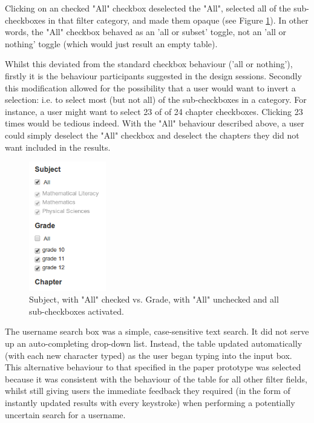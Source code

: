 Clicking on an checked "All" checkbox deselected the "All", selected all of the sub-checkboxes in that filter category, and made them opaque (see Figure \ref{fig:checkboxes2}). In other words, the "All" checkbox behaved as an 'all or subset' toggle, not an 'all or nothing' toggle (which would just result an empty table). 

Whilst this deviated from the standard checkbox behaviour ('all or nothing'), firstly it is the behaviour participants suggested in the design sessions. Secondly \citep[p. 435]{Galitz} this modification allowed for the possibility that a user would want to invert a selection: i.e. to select most (but not all) of the sub-checkboxes in a category. For instance, a user might want to select 23 of of 24 chapter checkboxes. Clicking 23 times would be tedious indeed. With the "All" behaviour described above, a user could simply deselect the "All" checkbox and deselect the chapters they did not want included in the results.

\begin{figure}[h!]
    \centering
    \includegraphics[width=0.3\textwidth]{Figures/V1/alldeselected1.PNG}
 \caption{Subject, with "All" checked vs. Grade, with "All" unchecked and all sub-checkboxes activated.}
 \label{fig:checkboxes2}
\end{figure}

The username search box was a simple, case-sensitive text search. It did not serve up an auto-completing drop-down list. Instead, the table updated automatically (with each new character typed) as the user began typing into the input box. This alternative behaviour to that specified in the paper prototype was selected because it was consistent \citep[p. 261]{DixFinlay} with the behaviour of the table for all other filter fields, whilst still giving users the immediate feedback they required (in the form of instantly updated results with every keystroke) when performing a potentially uncertain search for a username. 

